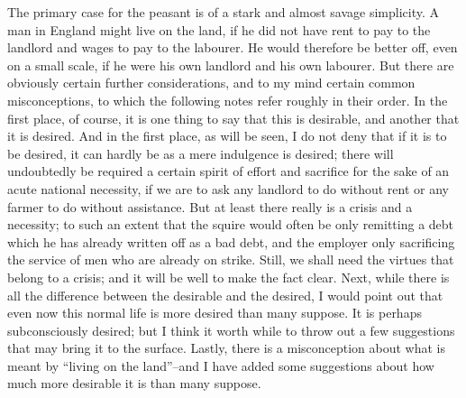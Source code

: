 \documentclass{book}
\begin{document}
The primary case for the peasant is of a stark and almost savage simplicity. A man in England might live on the land, if he did not have rent to pay to the landlord and wages to pay to the labourer. He would therefore be better off, even on a small scale, if he were his own landlord and his own labourer. But there are obviously certain further considerations, and to my mind certain common misconceptions, to which the following notes refer roughly in their order. In the first place, of course, it is one thing to say that this is desirable, and another that it is desired. And in the first place, as will be seen, I do not deny that if it is to be desired, it can hardly be as a mere indulgence is desired; there will undoubtedly be required a certain spirit of effort and sacrifice for the sake of an acute national necessity, if we are to ask any landlord to do without rent or any farmer to do without assistance. But at least there really is a crisis and a necessity; to such an extent that the squire would often be only remitting a debt which he has already written off as a bad debt, and the employer only sacrificing the service of men who are already on strike. Still, we shall need the virtues that belong to a crisis; and it will be well to make the fact clear. Next, while there is all the difference between the desirable and the desired, I would point out that even now this normal life is more desired than many suppose. It is perhaps subconsciously desired; but I think it worth while to throw out a few suggestions that may bring it to the surface. Lastly, there is a misconception about what is meant by “living on the land”–and I have added some suggestions about how much more desirable it is than many suppose.
\end{document}
